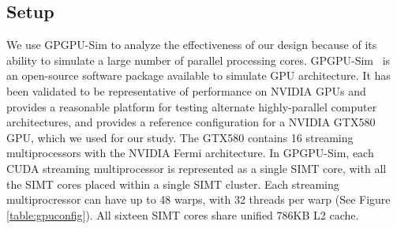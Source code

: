 \subsection{Setup}

We use GPGPU-Sim to analyze the effectiveness of our design because of
its ability to simulate a large number of parallel processing cores.
GPGPU-Sim~\cite{bakhodayuan09} is an open-source software package
available to simulate GPU architecture. 
It has been validated to be representative of performance on NVIDIA
GPUs and provides a reasonable platform for testing alternate
highly-parallel computer architectures, and provides a reference
configuration for a NVIDIA GTX580 GPU, which we used for our study.
The GTX580 contains 16 streaming multiprocessors with the NVIDIA Fermi
architecture. 
In GPGPU-Sim, each CUDA streaming multiprocessor is represented as a
single SIMT core, with all the SIMT cores placed within a single SIMT cluster. 
Each streaming multiprocressor can have up to 48 warps, with 32
threads per warp (See Figure \ref{table:gpuconfig}). 
All sixteen SIMT cores share unified 786KB L2 cache. 


